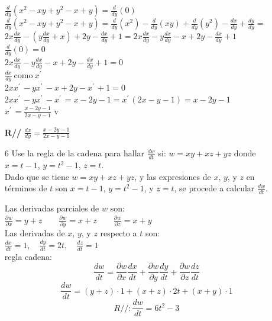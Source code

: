 \documentclass[13pt]{memoir}
\begin{document}
\begin{enumerate}
$\frac{d}{dy}\left(x^2-xy+y^2-x+y\right)=\frac{d}{dy}\left(0\right)$\\ 

$\frac{d}{dy}\left(x^2-xy+y^2-x+y\right) = \frac{d}{dy}\left(x^2\right)-\frac{d}{dy}\left(xy\right)+\frac{d}{dy}\left(y^2\right)-\frac{dx}{dy}+\frac{dy}{dy} =$	\\ 
$2x\frac{dx}{dy}-\left(y\frac{dx}{dy}+x\right)+2y-\frac{dx}{dy}+1 =2x\frac{dx}{dy}-y\frac{dx}{dy}-x+2y-\frac{dx}{dy}+1$\\

$\frac{d}{dy}\left(0\right)=0$\\

$2x\frac{dx}{dy}-y\frac{dx}{dy}-x+2y-\frac{dx}{dy}+1=0$\\

{\tiny $\frac{dx}{dy}\mathrm{\:como\:}x^{'\:}$}\\
$2xx^{'\:}-yx^{'\:}-x+2y-x^{'\:}+1=0$\\
$2xx^{'\:}-yx^{'\:}-x^{'\:}=x-2y-1 = x^{'\:}\left(2x-y-1\right)=x-2y-1$ \\
$x^{'\:}=\frac{x-2y-1}{2x-y-1}$ v

\textbf{ R//} $\frac{dx}{dy}=\frac{x-2y-1}{2x-y-1}$\\
	
\item[ 6] Use la regla de la cadena para hallar $\frac{dw}{dt}$ si: $w=xy+xz+yz$ donde $x=t-1$, $y=t^2-1$, $z=t$.\\


Dado que se tiene \(w = xy + xz + yz\), y las expresiones de \(x\), \(y\), y \(z\) en términos de \(t\) son \(x = t-1\), \(y = t^2-1\), y \(z = t\), se procede a calcular \(\frac{dw}{dt}\).

{\tiny Las derivadas parciales de \(w\) son:}\\
$\frac{\partial w}{\partial x} = y + z \qquad \frac{\partial w}{\partial y} = x + z \qquad \frac{\partial w}{\partial z} = x + y$ \\

{\tiny Las derivadas de \(x\), \(y\), y \(z\) respecto a \(t\) son:} \\
$\frac{dx}{dt} = 1, \quad \frac{dy}{dt} = 2t, \quad \frac{dz}{dt} = 1$\\

{\tiny regla cadena:} \\
\[
\frac{dw}{dt} = \frac{\partial w}{\partial x}\frac{dx}{dt} + \frac{\partial w}{\partial y}\frac{dy}{dt} + \frac{\partial w}{\partial z}\frac{dz}{dt}
\]
\[
\frac{dw}{dt} = (y + z) \cdot 1 + (x + z) \cdot 2t + (x + y) \cdot 1
\]
\[
R//: \frac{dw}{dt} = 6t^2 - 3
\]





\end{enumerate}	
\end{document}
